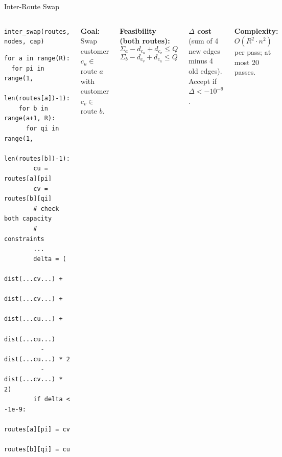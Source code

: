 \documentclass{beamer}
\begin{document}
\begin{frame}[fragile]{Inter-Route Swap}

\begin{columns}[T]

\begin{block}{\texttt{inter\_swap(routes, nodes, cap)}}
\begin{lstlisting}
for a in range(R):
  for pi in range(1,
        len(routes[a])-1):
    for b in range(a+1, R):
      for qi in range(1,
            len(routes[b])-1):
        cu = routes[a][pi]
        cv = routes[b][qi]
        # check both capacity
        # constraints
        ...
        delta = (
          dist(...cv...) +
          dist(...cv...) +
          dist(...cu...) +
          dist(...cu...)
          - dist(...cu...) * 2
          - dist(...cv...) * 2)
        if delta < -1e-9:
          routes[a][pi] = cv
          routes[b][qi] = cu
\end{lstlisting}
\end{block}

\small
\textbf{Goal:} Swap customer $c_u \in$ route $a$ with customer $c_v \in$ route $b$.

\vspace{0.3em}
\textbf{Feasibility (both routes):}
\[
  \Sigma_a - d_{c_u} + d_{c_v} \leq Q
\]
\[
  \Sigma_b - d_{c_v} + d_{c_u} \leq Q
\]

\vspace{0.3em}
\textbf{$\Delta$ cost} (sum of 4 new edges minus 4 old edges). Accept if $\Delta < -10^{-9}$.

\vspace{0.3em}
\textbf{Complexity:} $O(R^2 \cdot n^2)$ per pass; at most 20 passes.
\end{columns}

\end{frame}
\end{document}
